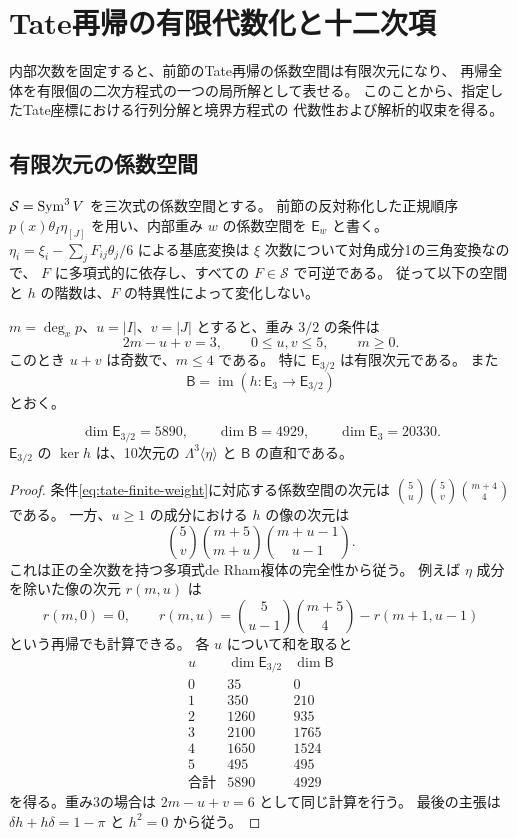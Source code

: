 \clearpage
\section{Tate再帰の有限代数化と十二次項}
\label{sec:tate-algebraization-twelfth}
\label{sec:finite-algebraic-tate}

内部次数を固定すると、前節のTate再帰の係数空間は有限次元になり、
再帰全体を有限個の二次方程式の一つの局所解として表せる。
このことから、指定したTate座標における行列分解と境界方程式の
代数性および解析的収束を得る。

\subsection{有限次元の係数空間}

$\mathcal S=\operatorname{Sym}^3V$ を三次式の係数空間とする。
前節の反対称化した正規順序
$p(x)\theta_I\eta_{[J]}$ を用い、内部重み $w$ の係数空間を
$\mathsf E_w$ と書く。
$\eta_i=\xi_i-\sum_jF_{ij}\theta_j/6$ による基底変換は
$\xi$ 次数について対角成分1の三角変換なので、
$F$ に多項式的に依存し、すべての $F\in\mathcal S$ で可逆である。
従って以下の空間と $h$ の階数は、$F$ の特異性によって変化しない。

$m=\deg_xp$、$u=|I|$、$v=|J|$ とすると、重み $3/2$ の条件は
\[
 2m-u+v=3,\qquad 0\le u,v\le5,\qquad m\ge0.
 \tag{A1}\label{eq:tate-finite-weight}
\]
このとき $u+v$ は奇数で、$m\le4$ である。
特に $\mathsf E_{3/2}$ は有限次元である。
また
\[
 \mathsf B=\operatorname{im}
       (h\colon\mathsf E_3\longrightarrow\mathsf E_{3/2})
\]
とおく。

\begin{lemma}[補助係数の個数]
\label{lem:finite-tate-dimensions}
\[
 \dim\mathsf E_{3/2}=5890,\qquad
 \dim\mathsf B=4929,\qquad
 \dim\mathsf E_3=20330.
\]
$\mathsf E_{3/2}$ の $\ker h$ は、10次元の
$\Lambda^3\langle\eta\rangle$ と $\mathsf B$ の直和である。
\end{lemma}
\begin{proof}
条件\eqref{eq:tate-finite-weight}に対応する係数空間の次元は
$\binom5u\binom5v\binom{m+4}4$ である。
一方、$u\ge1$ の成分における $h$ の像の次元は
\[
 \binom5v
 \binom{m+5}{m+u}\binom{m+u-1}{u-1}.
\]
これは正の全次数を持つ多項式de Rham複体の完全性から従う。
例えば $\eta$ 成分を除いた像の次元 $r(m,u)$ は
\[
 r(m,0)=0,\qquad
 r(m,u)=\binom5{u-1}\binom{m+5}4-r(m+1,u-1)
\]
という再帰でも計算できる。
各 $u$ について和を取ると
\[
\begin{array}{c|rr}
u&\dim\mathsf E_{3/2}&\dim\mathsf B\\\hline
0&35&0\\
1&350&210\\
2&1260&935\\
3&2100&1765\\
4&1650&1524\\
5&495&495\\\hline
\text{合計}&5890&4929
\end{array}
\]
を得る。重み3の場合は $2m-u+v=6$ として同じ計算を行う。
最後の主張は $\delta h+h\delta=1-\pi$ と $h^2=0$ から従う。
\end{proof}

